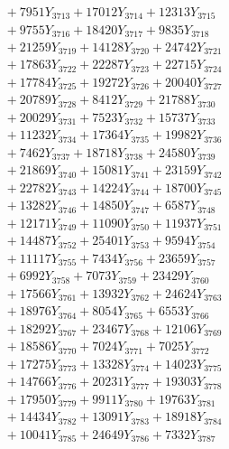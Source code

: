 \documentclass[a4paper,10pt]{article}
\begin{document}
{\begin{align}
&\;  + 7951 Y_{3713} + 17012 Y_{3714} + 12313 Y_{3715} \\[0.3ex]
&\;  + 9755 Y_{3716} + 18420 Y_{3717} + 9835 Y_{3718} \\[0.5ex]\allowbreak
&\;  + 21259 Y_{3719} + 14128 Y_{3720} + 24742 Y_{3721} \\[0.3ex]
&\;  + 17863 Y_{3722} + 22287 Y_{3723} + 22715 Y_{3724} \\[0.3ex]
&\;  + 17784 Y_{3725} + 19272 Y_{3726} + 20040 Y_{3727} \\[0.3ex]
&\;  + 20789 Y_{3728} + 8412 Y_{3729} + 21788 Y_{3730} \\[0.3ex]
&\;  + 20029 Y_{3731} + 7523 Y_{3732} + 15737 Y_{3733} \\[0.3ex]
&\;  + 11232 Y_{3734} + 17364 Y_{3735} + 19982 Y_{3736} \\[0.3ex]
&\;  + 7462 Y_{3737} + 18718 Y_{3738} + 24580 Y_{3739} \\[0.3ex]
&\;  + 21869 Y_{3740} + 15081 Y_{3741} + 23159 Y_{3742} \\[0.3ex]
&\;  + 22782 Y_{3743} + 14224 Y_{3744} + 18700 Y_{3745} \\[0.3ex]
&\;  + 13282 Y_{3746} + 14850 Y_{3747} + 6587 Y_{3748} \\[0.5ex]\allowbreak
&\;  + 12171 Y_{3749} + 11090 Y_{3750} + 11937 Y_{3751} \\[0.3ex]
&\;  + 14487 Y_{3752} + 25401 Y_{3753} + 9594 Y_{3754} \\[0.3ex]
&\;  + 11117 Y_{3755} + 7434 Y_{3756} + 23659 Y_{3757} \\[0.3ex]
&\;  + 6992 Y_{3758} + 7073 Y_{3759} + 23429 Y_{3760} \\[0.3ex]
&\;  + 17566 Y_{3761} + 13932 Y_{3762} + 24624 Y_{3763} \\[0.3ex]
&\;  + 18976 Y_{3764} + 8054 Y_{3765} + 6553 Y_{3766} \\[0.3ex]
&\;  + 18292 Y_{3767} + 23467 Y_{3768} + 12106 Y_{3769} \\[0.3ex]
&\;  + 18586 Y_{3770} + 7024 Y_{3771} + 7025 Y_{3772} \\[0.3ex]
&\;  + 17275 Y_{3773} + 13328 Y_{3774} + 14023 Y_{3775} \\[0.3ex]
&\;  + 14766 Y_{3776} + 20231 Y_{3777} + 19303 Y_{3778} \\[0.5ex]\allowbreak
&\;  + 17950 Y_{3779} + 9911 Y_{3780} + 19763 Y_{3781} \\[0.3ex]
&\;  + 14434 Y_{3782} + 13091 Y_{3783} + 18918 Y_{3784} \\[0.3ex]
&\;  + 10041 Y_{3785} + 24649 Y_{3786} + 7332 Y_{3787} \\[0.3ex]

\end{align}}
\end{document}
